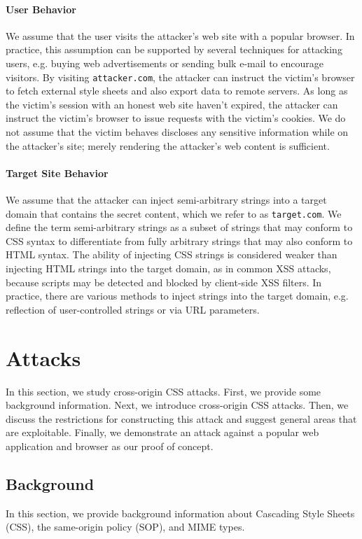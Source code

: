 \documentclass{acm_proc_article-sp}
\begin{document}
\paragraph{User Behavior}
We assume that the user visits the attacker's web site with a popular browser. In practice, this assumption can be supported by several techniques for attacking users, e.g. buying web advertisements or sending bulk e-mail to encourage visitors. By visiting \texttt{attacker.com}, the attacker can instruct the victim's browser to fetch external style sheets and also export data to remote servers. As long as the victim's session with an honest web site haven't expired, the attacker can instruct the victim's browser to issue requests with the victim's cookies.
We do not assume that the victim behaves discloses any sensitive information
while on the attacker's site; merely rendering the attacker's web content
is sufficient.

\paragraph{Target Site Behavior}
We assume that the attacker can inject semi-arbitrary strings into a target domain that contains the secret content, which we refer to as \texttt{target.com}. We define the term semi-arbitrary strings as a subset of strings that may conform to CSS syntax to differentiate from fully arbitrary strings that may also conform to HTML syntax. The ability of injecting CSS strings is considered weaker than injecting HTML strings into the target domain, as in common XSS attacks, because scripts may be detected and blocked by client-side XSS filters. In practice, there are various methods to inject strings into the target domain, e.g. reflection of user-controlled strings or via URL parameters.

\section{Attacks} \label{sec:attacks}
In this section, we study cross-origin CSS attacks. First, we provide some background information. Next, we introduce cross-origin CSS attacks. Then, we discuss the restrictions for constructing this attack and suggest general areas that are exploitable. Finally, we demonstrate an attack against a popular web application and browser as our proof of concept.

\subsection{Background}
In this section, we provide background information about Cascading Style Sheets (CSS), the same-origin policy (SOP), and MIME types.
\end{document}
